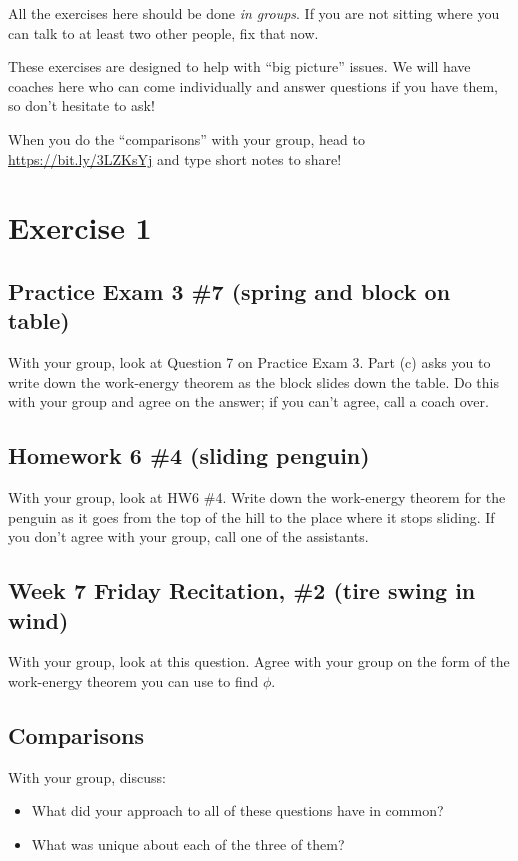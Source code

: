 \documentclass[12pt]{article}
\begin{document}
All the exercises here should be done {\it in groups}. If you are not sitting where you can talk to at least two other people, fix that now.

These exercises are designed to help with ``big picture'' issues. We will have coaches here who can come individually and answer questions if you have them, so don't hesitate to ask!

When you do the ``comparisons'' with your group, head to \url{https://bit.ly/3LZKsYj} and type short notes to share!


\section{Exercise 1}

\subsection{Practice Exam 3 \#7 (spring and block on table)}

With your group, look at Question 7 on Practice Exam 3. Part (c) asks you to write down the work-energy theorem as the block slides down the table. Do this with your group and agree on the answer; if you can't agree, call a coach over.

\subsection{Homework 6 \#4 (sliding penguin)}

With your group, look at HW6 \#4. Write down the work-energy theorem for the penguin as it goes from the top of the hill to the place where it stops sliding. If you don't agree with your group, call one of the assistants.

\subsection{Week 7 Friday Recitation, \#2 (tire swing in wind)}

With your group, look at this question. Agree with your group on the form of the work-energy theorem you can use to find $\phi$.

\subsection{Comparisons}

With your group, discuss:

\begin{itemize}
	\item What did your approach to all of these questions have in common?
	\item What was unique about each of the three of them?
\end{itemize}
\end{document}
